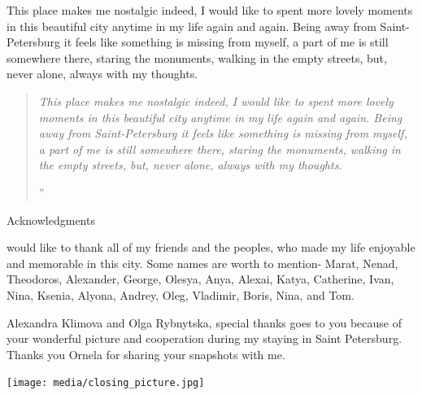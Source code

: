\documentclass[10pt,a4paper]{article} %
\newcommand{\NewsItem}[1]{ %
\usefont{T1}{fvs}{n}{n} %
\vspace{24pt}\large #1\vspace{3pt} %
\par \normalsize \normalfont}
\begin{document}
\begin{multicols}{3}
This place makes me nostalgic indeed, 
I would like to spent more lovely moments in this beautiful city anytime in my life again and again. Being away from Saint-Petersburg it feels like something is missing from myself, a part of me is still somewhere there, staring the monuments, walking in the empty streets, but, never alone, always with my thoughts.




\begin{quotation} %

\noindent\normalsize\textit{This place makes me nostalgic indeed, 
	I would like to spent more lovely moments in this beautiful city anytime in my life again and again. 
	Being away from Saint-Petersburg it feels like something is missing from myself, 
	a part of me is still somewhere there, staring the monuments, 
	walking in the empty streets, but, never alone, always with my thoughts.
}

\hfill{\Huge''}

\end{quotation}

\NewsItem{Acknowledgments}

 would like to thank all of my friends and the peoples, 
 who made my life enjoyable and memorable in this city. 
 Some names are worth to mention- Marat, Nenad, Theodoros, Alexander, George, Olesya, 
 Anya, Alexai, Katya, Catherine, Ivan, Nina, Ksenia, Alyona, Andrey, Oleg, Vladimir, 
 Boris, Nina, and Tom.

Alexandra Klimova and Olga Rybnytska, special thanks goes to you because of your 
wonderful picture and cooperation during my staying in Saint Petersburg. 
Thanks you Ornela for sharing your snapshots with me.

\end{multicols}


\begin{center}
	\vspace{10pt}
	\texttt{[image: media/closing\_picture.jpg]} %

	\vspace{10pt}
\end{center}
\end{document}
